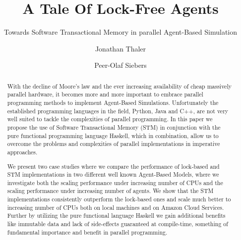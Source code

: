 \documentclass[format=acmsmall, review=true, screen=true]{acmart}
\begin{document}


\title[A Tale Of Lock-Free Agents]{A Tale Of Lock-Free Agents}
\subtitle{Towards Software Transactional Memory in parallel Agent-Based Simulation}

\author{Jonathan Thaler}
\author{Peer-Olaf Siebers}

\begin{abstract}
With the decline of Moore's law and the ever increasing availability of cheap massively parallel hardware, it becomes more and more important to embrace parallel programming methods to implement Agent-Based Simulations. Unfortunately the established programming languages in the field, Python, Java and C++, are not very well suited to tackle the complexities of parallel programming. In this paper we propose the use of Software Transactional Memory (STM) in conjunction with the pure functional programming language Haskell, which in combination, allow us to overcome the problems and complexities of parallel implementations in imperative approaches.

We present two case studies where we compare the performance of lock-based and STM implementations in two different well known Agent-Based Models, where we investigate both the scaling performance under increasing number of CPUs and the scaling performance under increasing number of agents. We show that the STM implementations consistently outperform the lock-based ones and scale much better to increasing number of CPUs both on local machines and on Amazon Cloud Services. Further by utilizing the pure functional language Haskell we gain additional benefits like immutable data and lack of side-effects guaranteed at compile-time, something of fundamental importance and benefit in parallel programming.
\end{abstract}
\end{document}
